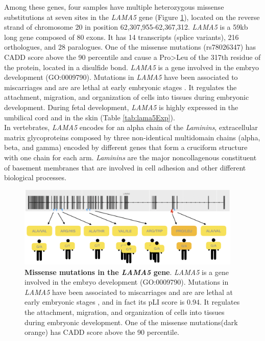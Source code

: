 Among these genes, four samples have multiple heterozygous missense substitutions at seven sites in the \textit{LAMA5} gene (Figure \ref{fig:lama5}), located on the reverse strand of chromosome 20 in position 62,307,955-62,367,312. \textit{LAMA5} is a 59kb long gene composed of 80 exons. It has 14 transcripts (splice variants), 216 orthologues, and 28 paralogues. One of the missense mutations (rs78026347) has CADD score above the 90 percentile and cause a Pro>Leu of the 317th residue of the protein, located in a disulfide bond.
\textit{LAMA5} is a gene involved in the embryo development (GO:0009790). Mutations in \textit{LAMA5} have been associated to miscarriages \cite{laisk2019genetic,pereza2017systematic,qiao2016whole,rull2012genetics,colley2019potential,quintero2017novel} and are are lethal at early embryonic stages \cite{dawes2019gene}. It regulates the attachment, migration, and organization of cells into tissues during embryonic development. During fetal development, \textit{LAMA5} is highly expressed in the umbilical cord and in the skin (Table \ref{tab:lama5Exp})\cite{noguchi2017fantom5}.\\ 
In vertebrates, \textit{LAMA5} encodes for an alpha chain of the \textit{Laminins}\cite{aumailley2013laminin}, extracellular matrix glycoproteins composed by three non-identical multidomain chains (alpha, beta, and gamma) encoded by different genes that form a cruciform structure with one chain for each arm. \textit{Laminins} are the major noncollagenous constituent of basement membranes that are involved in cell adhesion and other different biological processes.

\begin{figure}[H]
\centering
\includegraphics[width=0.95\textwidth]{fig/LAMA5_structure.png}
\decoRule
\caption{\textbf{Missense mutations in the \textit{LAMA5} gene}. \textit{LAMA5} is a gene involved in the embryo development (GO:0009790). Mutations in \textit{LAMA5} have been associated to miscarriages \cite{laisk2019genetic,pereza2017systematic,qiao2016whole,rull2012genetics,colley2019potential,quintero2017novel} and are are lethal at early embryonic stages \cite{dawes2019gene},  and in fact its pLI score is 0.94. It regulates the attachment, migration, and organization of cells into tissues during embryonic development. One of the missense mutations(dark orange) has CADD score above the 90 percentile.} 
\label{fig:lama5}
\end{figure}
